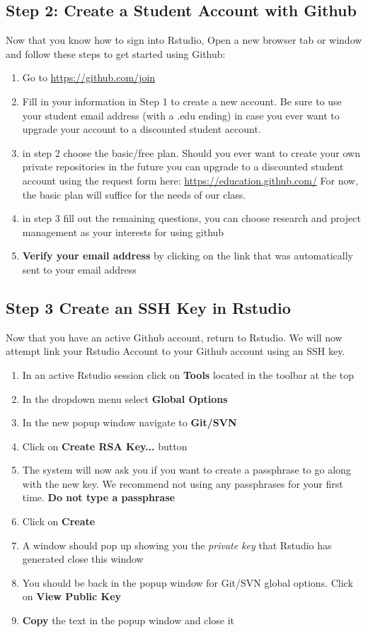 \documentclass{article}\usepackage[]{graphicx}\usepackage[]{color}
\begin{document}
  \subsection*{Step 2: Create a Student Account with Github}
 Now that you know how to sign into Rstudio, Open a new browser tab or window and follow these steps to get started using Github:
    \begin{enumerate}
    \item Go to \url{https://github.com/join}
    \item Fill in your information in Step 1 to create a new account. Be sure to use your student email address (with a .edu ending) in case you ever want to upgrade your account to a discounted student account. 
    \item in step 2 choose the basic/free plan. Should you ever want to create your own private repositories in the future you can upgrade to a discounted student account using the request form here: \url{https://education.github.com/} For now, the basic plan will suffice for the needs of our class. 
    \item in step 3 fill out the remaining questions, you can choose research and project management as your interests for using github
    
    \item \textbf{Verify your email address} by clicking on the link that was automatically sent to your email address
    \end{enumerate}
    
    
  \subsection*{Step 3 Create an SSH Key in Rstudio}
Now that you have an active Github account, return to Rstudio. We will now attempt link your Rstudio Account to your Github account using an SSH key. 
  \begin{enumerate}
  \item In an active Rstudio session click on \textbf{Tools} located in the toolbar at the top
  \item In the dropdown menu select \textbf{Global Options}
  \item In the new popup window navigate to \textbf{Git/SVN} 
  \item Click on \textbf{Create RSA Key...} button
  \item The system will now ask you if you want to create a passphrase to go along with the new key. We recommend not using any passphrases for your first time. \textbf{Do not type a passphrase}
  \item Click on \textbf{Create}
  \item A window should pop up showing you the \emph{private key} that Rstudio has generated close this window
  \item You should be back in the popup window for Git/SVN global options. Click on \textbf{View Public Key}
  \item \textbf{Copy} the text in the popup window and close it
  \end{enumerate}
  
\end{document}
